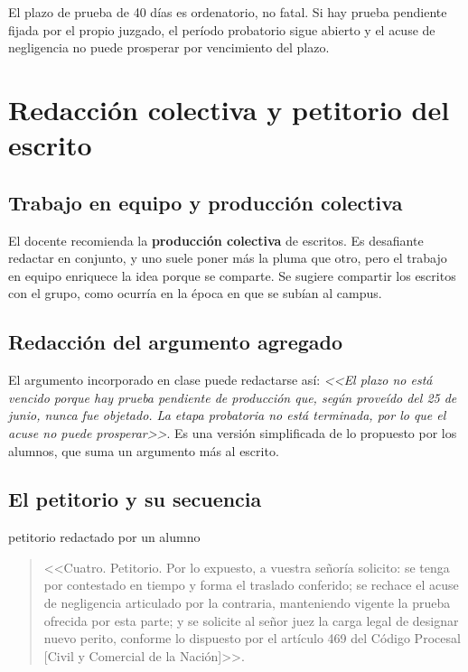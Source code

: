 \documentclass[12pt,oneside]{book}
\begin{document}
\begin{important}
El plazo de prueba de 40 días es ordenatorio, no fatal. Si hay prueba pendiente fijada por el propio juzgado, el período probatorio sigue abierto y el acuse de negligencia no puede prosperar por vencimiento del plazo.
\end{important}

\section{Redacción colectiva y petitorio del escrito}

\subsection{Trabajo en equipo y producción colectiva}

El docente recomienda la \textbf{producción colectiva} de escritos. Es desafiante redactar en conjunto, y uno suele poner más la pluma que otro, pero el trabajo en equipo enriquece la idea porque se comparte. Se sugiere compartir los escritos con el grupo, como ocurría en la época en que se subían al campus.

\subsection{Redacción del argumento agregado}

El argumento incorporado en clase puede redactarse así: \textit{<<El plazo no está vencido porque hay prueba pendiente de producción que, según proveído del 25 de junio, nunca fue objetado. La etapa probatoria no está terminada, por lo que el acuse no puede prosperar>>}. Es una versión simplificada de lo propuesto por los alumnos, que suma un argumento más al escrito.

\subsection{El petitorio y su secuencia}

\begin{example}{petitorio redactado por un alumno}
\begin{quote}
<<Cuatro. Petitorio. Por lo expuesto, a vuestra señoría solicito: se tenga por contestado en tiempo y forma el traslado conferido; se rechace el acuse de negligencia articulado por la contraria, manteniendo vigente la prueba ofrecida por esta parte; y se solicite al señor juez la carga legal de designar nuevo perito, conforme lo dispuesto por el artículo 469 del Código Procesal [Civil y Comercial de la Nación]>>.
\end{quote}
\end{example}
\end{document}
